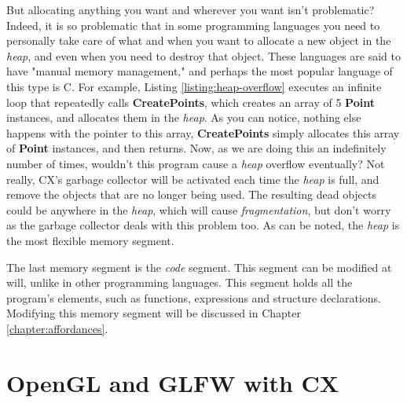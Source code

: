 \documentclass[11pt,fleqn,openany]{book} %
\begin{document}
But allocating anything you want and wherever you want isn't problematic? Indeed, it is so problematic that in some programming languages you need to personally take care of what and when you want to allocate a new object in the \emph{heap}, and even when you need to destroy that object. These languages are said to have "manual memory management," and perhaps the most popular language of this type is C. For example, Listing \ref{listing:heap-overflow} executes an infinite loop that repeatedly calls \textbf{CreatePoints}, which creates an array of 5 \textbf{Point} instances, and allocates them in the \emph{heap}. As you can notice, nothing else happens with the pointer to this array, \textbf{CreatePoints} simply allocates this array of \textbf{Point} instances, and then returns. Now, as we are doing this an indefinitely number of times, wouldn't this program cause a \emph{heap} overflow eventually? Not really, CX's garbage collector will be activated each time the \emph{heap} is full, and remove the objects that are no longer being used. The resulting dead objects could be anywhere in the \emph{heap}, which will cause \emph{fragmentation}, but don't worry as the garbage collector deals with this problem too. As can be noted, the \emph{heap} is the most flexible memory segment.

The last memory segment is the \emph{code} segment. This segment can be modified at will, unlike in other programming languages. This segment holds all the program's elements, such as functions, expressions and structure declarations. Modifying this memory segment will be discussed in Chapter \ref{chapter:affordances}.%


\chapter{OpenGL and GLFW with CX}
\label{chapter:opengl-and-glfw-with-cx}
\end{document}
